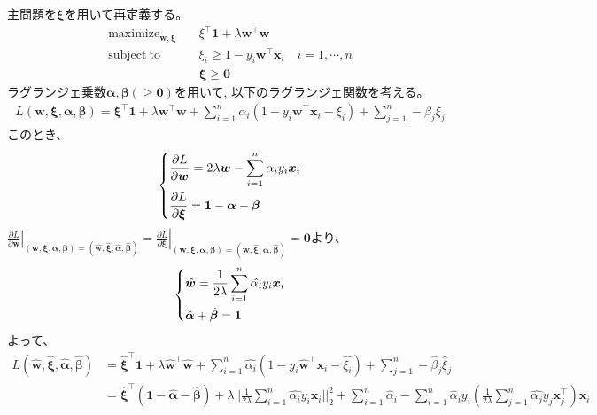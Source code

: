 \documentclass{jsarticle}
\begin{document}
\begin{enumerate}
  主問題を$\bm\xi$を用いて再定義する。
  \begin{align*}
    \mathrm{maximize}_{\bm w,\bm\xi}&\quad \xi^\top\bm 1 + \lambda\bm w^\top\bm w \\
    \mathrm{subject\ to}&\quad \xi_i\ge1-y_i\bm w^\top\bm x_i \quad i=1,\cdots,n\\
    &\quad \bm\xi\ge\bm0
  \end{align*}
  ラグランジェ乗数$\bm\alpha,\bm\beta(\ge\bm0)$を用いて, 以下のラグランジェ関数を考える。
  \begin{align*}
    L(\bm w,\bm\xi,\bm\alpha,\bm\beta) = \bm\xi^\top\bm 1 + \lambda\bm w^\top\bm w + \sum_{i=1}^n \alpha_i\left(1-y_i\bm w^\top\bm x_i - \xi_i\right) + \sum_{j=1}^n-\beta_j\xi_j
  \end{align*}
  このとき、
  \begin{align*}
    \begin{dcases}
      \frac{\partial L}{\partial \bm w} = 2\lambda\bm w - \sum_{i=1}^n\alpha_iy_i\bm x_i\\
      \frac{\partial L}{\partial \bm\xi} = \bm1-\bm\alpha-\bm\beta
    \end{dcases}
  \end{align*}
  $\left.\frac{\partial L}{\partial \bm w}\right|_{(\bm w,\bm\xi,\bm\alpha,\bm\beta)=(\hat{\bm w},\hat{\bm\xi},\hat{\bm\alpha},\hat{\bm\beta})} = \left.\frac{\partial L}{\partial \bm\xi}\right|_{(\bm w,\bm\xi,\bm\alpha,\bm\beta)=(\hat{\bm w},\hat{\bm\xi},\hat{\bm\alpha},\hat{\bm\beta})}=\bm0$より、
  \begin{align}
    \begin{dcases}
      \hat{\bm w} = \frac{1}{2\lambda}\sum_{i=1}^n\hat{\alpha_i}y_i\bm x_i \\
      \hat{\bm\alpha}+\hat{\bm\beta}=\bm1
    \end{dcases}
  \end{align}
  よって、
  \begin{align*}
    L(\hat{\bm w},\hat{\bm\xi},\hat{\bm\alpha},\hat{\bm\beta}) &= \hat{\bm\xi}^\top\bm 1 + \lambda\hat{\bm w}^\top\hat{\bm w} + \sum_{i=1}^n \hat{\alpha_i}\left(1-y_i\hat{\bm w}^\top\bm x_i - \hat{\xi_i}\right) + \sum_{j=1}^n-\hat\beta_j\hat\xi_j \\
    &= \hat{\bm\xi}^\top(\bm 1 -\hat{\bm\alpha}-\hat{\bm\beta})+ \lambda||\frac{1}{2\lambda}\sum_{i=1}^n\hat{\alpha_i}y_i\bm x_i||_2^2 
    + \sum_{i=1}^n \hat\alpha_i
    - \sum_{i=1}^n \hat\alpha_iy_i\left(\frac{1}{2\lambda}\sum_{j=1}^n\hat{\alpha_j}y_j\bm x_j^\top\right)\bm x_i \\

\end{align*}
\end{enumerate}
\end{document}
